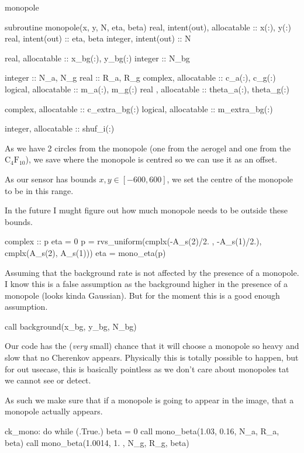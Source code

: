 \documentclass[10pt, a4paper]{article}
\begin{document}
\begin{codeblock}{monopole}
\begin{code}
subroutine monopole(x, y, N, eta, beta)
	real, intent(out), allocatable :: x(:), y(:)
	real, intent(out) :: eta, beta
	integer, intent(out) :: N 
	
	real, allocatable :: x_bg(:), y_bg(:)
	integer :: N_bg 
	
	integer :: N_a, N_g
	real    :: R_a, R_g
	complex, allocatable :: c_a(:), c_g(:)
	logical, allocatable :: m_a(:), m_g(:)
	real   , allocatable :: theta_a(:), theta_g(:)
	
	complex, allocatable :: c_extra_bg(:)
	logical, allocatable :: m_extra_bg(:)
	
	integer, allocatable :: shuf_i(:)	
\end{code}

As we have 2 circles from the monopole (one from the aerogel and one from the $\text{C}_4 \text{F}_10$), we save where the monopole is centred so we can use it as an offset. 

As our sensor has bounds $x, y \in [-600, 600]$, we set the centre of the monopole to be in this range. 

In the future I mught figure out how much monopole needs to be outside these bounds. 

\begin{code}
	complex :: p 
	eta = 0
	p = rvs_uniform(cmplx(-A_s(2)/2. , -A_s(1)/2.), cmplx(A_s(2), A_s(1)))
	eta = mono_eta(p)
\end{code}

Assuming that the background rate is not affected by the presence of a monopole. 
I know this is a false assumption as the background higher in the presence of a monopole (looks kinda Gaussian). 
But for the moment this is a good enough assumption.

\begin{code}
	call background(x_bg, y_bg, N_bg)
\end{code}

Our code has the (\emph{very} small) chance that it will choose a monopole so heavy and slow that no Cherenkov appears. 
Physically this is totally possible to happen, but for out usecase, this is basically pointless as we don't care about monopoles tat we cannot see or detect. 

As such we make sure that if a monopole is going to appear in the image, that a monopole actually appears. 

\begin{code}
	ck_mono: do while (.True.)
		beta = 0
		call mono_beta(1.03,   0.16, N_a, R_a, beta)
		call mono_beta(1.0014, 1.  , N_g, R_g, beta)
		

\end{code}
\end{codeblock}
\end{document}
